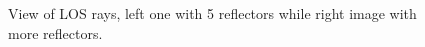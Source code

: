 \documentclass[12pt,DIV14,BCOR12mm,a4paper,footinclude=false,headinclude,parskip=half-,twoside,openright,cleardoublepage=empty,toc=index,bibliography=totoc,listof=totoc]{scrreprt}
\numberwithin{equation}{chapter}
\begin{document}
\begin{figure}[t]
    \centering
    \begin{subfigure}{0.45\textwidth}
        \centering
    \end{subfigure}
    \begin{subfigure}{0.45\textwidth}
        \centering
    \end{subfigure}
    \caption{View of LOS rays, left one with 5 reflectors while right image with more reflectors.}
    \label{view of LOS rays}
\end{figure}
\end{document}
